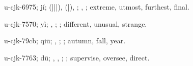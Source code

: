\begin{multicols}{2}
{\cjkgGlue{}u-cjk-6975; jí; \cjkgGlue{}\cjkgGlue{}(\cjkgGlue{}|\cjkgGlue{}|\cjkgGlue{}|\cjkgGlue{}), \cjkgGlue{}\cjkgGlue{}(\cjkgGlue{}|\cjkgGlue{}), \cjkgGlue{}\cjkgGlue{}\cjkgGlue{}; \cjkgGlue{}, \cjkgGlue{}; extreme, utmost, furthest, final.

\cjkgGlue{}u-cjk-7570; yì; \cjkgGlue{}\cjkgGlue{}\cjkgGlue{}, \cjkgGlue{}; \cjkgGlue{}; different, unusual, strange.

\cjkgGlue{}u-cjk-79cb; qiū; \cjkgGlue{}, \cjkgGlue{}; \cjkgGlue{}; autumn, fall, year.

\cjkgGlue{}u-cjk-7763; dū; \cjkgGlue{}, \cjkgGlue{}, \cjkgGlue{}; \cjkgGlue{}; supervise, oversee, direct.

}
\end{multicols}
